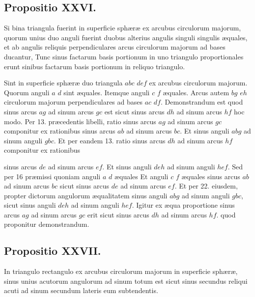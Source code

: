 \documentclass[11pt,a4paper]{article}
\begin{document}
\subsection*{Propositio XXVI.}

Si bina triangula fuerint in superficie sphæræ ex arcubus
circulorum majorum, quorum unius duo anguli fuerint
duobus alterius angulis singuli singulis æquales, et ab
angulis reliquis perpendiculares arcus circulorum majorum
ad bases ducantur, Tunc sinus factarum basis portionum
in uno triangulo proportionales erunt sinibus factarum
basis portionum in reliquo triangulo.

Sint in superficie sphæræ duo triangula $abc$ $def$ ex arcubus circulorum
majorum. Quorum anguli $a$ $d$ sint æquales. Itemque anguli $c$ $f$
æquales. Arcus autem $bg$ $eh$ circulorum majorum perpendiculares
ad bases $ac$ $df$. Demonstrandum est quod sinus arcus $ag$ ad
sinum arcus $gc$ est sicut sinus arcus $dh$ ad sinum arcus $hf$ hoc modo.
Per 13. præcedentis libelli, ratio sinus arcus $ag$ ad sinum arcus
$gc$ componitur ex rationibus sinus arcus $ab$ ad sinum arcus $bc$.
Et sinus anguli $abg$ ad sinum anguli $gbc$. Et per eandem 13.
ratio sinus arcus $dh$ ad sinum arcus $hf$ componitur ex rationibus

sinus arcus $de$ ad sinum arcus $ef$. Et sinus anguli $deh$ ad sinum
anguli $hef$. Sed per 16 præmissi quoniam anguli $a$ $d$ æquales
Et anguli $c$ $f$ æquales sinus arcus $ab$ ad sinum arcus $bc$ sicut
sinus arcus $de$ ad sinum arcus $ef$. Et per 22. eiusdem, propter
dictorum angulorum æqualitatem sinus anguli $abg$ ad sinum
anguli $gbc$, sicut sinus anguli $deh$ ad sinum anguli $hef$.
Igitur ex æqua proportione sinus arcus $ag$ ad sinum arcus $gc$
erit sicut sinus arcus $dh$ ad sinum arcus $hf$. quod proponitur
demonstrandum.

\subsection*{Propositio XXVII.}

In triangulo rectangulo ex arcubus circulorum majorum
in superficie sphæræ, sinus unius acutorum angulorum
ad sinum totum est sicut sinus secundus reliqui acuti
ad sinum secundum lateris eum subtendentis.
\end{document}
